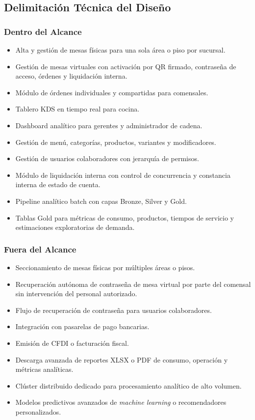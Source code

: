 \subsection{Delimitación Técnica del Diseño}

\subsubsection{Dentro del Alcance}

\begin{itemize}[leftmargin=1.5em]
  \item Alta y gestión de mesas físicas para una sola área o piso por sucursal.
  \item Gestión de mesas virtuales con activación por QR firmado, contraseña de acceso,
  órdenes y liquidación interna.
  \item Módulo de órdenes individuales y compartidas para comensales.
  \item Tablero KDS en tiempo real para cocina.
  \item Dashboard analítico para gerentes y administrador de cadena.
  \item Gestión de menú, categorías, productos, variantes y modificadores.
  \item Gestión de usuarios colaboradores con jerarquía de permisos.
  \item Módulo de liquidación interna con control de concurrencia y constancia interna
  de estado de cuenta.
  \item Pipeline analítico batch con capas Bronze, Silver y Gold.
  \item Tablas Gold para métricas de consumo, productos, tiempos de servicio y
  estimaciones exploratorias de demanda.
\end{itemize}

\subsubsection{Fuera del Alcance}

\begin{itemize}[leftmargin=1.5em]
  \item Seccionamiento de mesas físicas por múltiples áreas o pisos.
  \item Recuperación autónoma de contraseña de mesa virtual por parte del comensal sin
  intervención del personal autorizado.
  \item Flujo de recuperación de contraseña para usuarios colaboradores.
  \item Integración con pasarelas de pago bancarias.
  \item Emisión de CFDI o facturación fiscal.
  \item Descarga avanzada de reportes XLSX o PDF de consumo, operación y métricas
  analíticas.
  \item Clúster distribuido dedicado para procesamiento analítico de alto volumen.
  \item Modelos predictivos avanzados de \textit{machine learning} o recomendadores
  personalizados.
\end{itemize}

